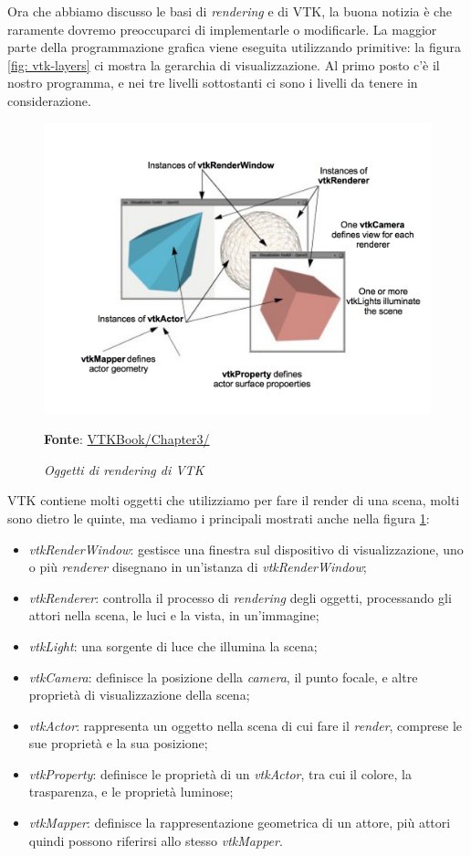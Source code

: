 Ora che abbiamo discusso le basi di \emph{rendering} e di VTK, la buona notizia è che raramente dovremo preoccuparci di implementarle o modificarle. La maggior parte della programmazione grafica viene eseguita utilizzando primitive: la figura \ref{fig: vtk-layers} ci mostra la gerarchia di visualizzazione. Al primo posto c'è il nostro programma, e nei tre livelli sottostanti ci sono i livelli da tenere in considerazione.

\begin{figure}[h]
    \centering
    \includegraphics[scale=0.5]{immagini/volumerendering/vtkobjects.png}
    \caption{\textit{Oggetti di rendering di VTK}}
    \textbf{Fonte}: \href{https://lorensen.github.io/VTKExamples/site/VTKBook/03Chapter3/}{VTKBook/Chapter3/}
    \label{fig: Oggetti Rendering VTK}
\end{figure}

VTK contiene molti oggetti che utilizziamo per fare il render di una scena, molti sono dietro le quinte, ma vediamo i principali mostrati anche nella figura \ref{fig: Oggetti Rendering VTK}:
\begin{itemize}
\item \emph{vtkRenderWindow}: gestisce una finestra sul dispositivo di visualizzazione, uno o più \emph{renderer} disegnano in un'istanza di \emph{vtkRenderWindow};
\item \emph{vtkRenderer}: controlla il processo di \emph{rendering} degli oggetti, processando gli attori nella scena, le luci e la vista, in un'immagine;
\item \emph{vtkLight}: una sorgente di luce che illumina la scena;
\item \emph{vtkCamera}: definisce la posizione della \emph{camera}, il punto focale, e altre proprietà di visualizzazione della scena;
\item \emph{vtkActor}: rappresenta un oggetto nella scena di cui fare il \emph{render}, comprese le sue proprietà e la sua posizione;
\item \emph{vtkProperty}: definisce le proprietà di un \emph{vtkActor}, tra cui il colore, la trasparenza, e le proprietà luminose;  
\item \emph{vtkMapper}: definisce la rappresentazione geometrica di un attore, più attori quindi possono riferirsi allo stesso \emph{vtkMapper}.
\end{itemize}

